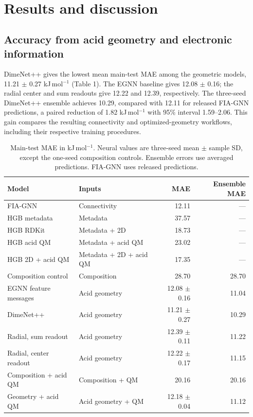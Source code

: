 \section{Results and discussion}

\subsection{Accuracy from acid geometry and electronic information}

DimeNet++ gives the lowest mean main-test MAE among the geometric models, 11.21 $\pm$ 0.27 kJ\,mol$^{-1}$ (Table 1). The EGNN baseline gives 12.08 $\pm$ 0.16; the radial center and sum readouts give 12.22 and 12.39, respectively. The three-seed DimeNet++ ensemble achieves 10.29, compared with 12.11 for released FIA-GNN predictions, a paired reduction of 1.82 kJ\,mol$^{-1}$ with 95\% interval 1.59--2.06. This gain compares the resulting connectivity and optimized-geometry workflows, including their respective training procedures.

\begin{table}[tp]
\centering\small
\caption{Main-test MAE in kJ\,mol$^{-1}$. Neural values are three-seed mean $\pm$ sample SD, except the one-seed composition controls. Ensemble errors use averaged predictions. FIA-GNN uses released predictions.}
\begin{tabularx}{\textwidth}{@{}>{\raggedright\arraybackslash}p{}>{\raggedright\arraybackslash}Xrr@{}}
\toprule
Model & Inputs & MAE & Ensemble MAE \\ \midrule
FIA-GNN & Connectivity & 12.11 & --- \\
HGB metadata & Metadata & 37.57 & --- \\
HGB RDKit & Metadata + 2D & 18.73 & --- \\
HGB acid QM & Metadata + acid QM & 23.02 & --- \\
HGB 2D + acid QM & Metadata + 2D + acid QM & 17.35 & --- \\
Composition control & Composition & 28.70 & 28.70 \\
EGNN feature messages & Acid geometry & 12.08 $\pm$ 0.16 & 11.04 \\
DimeNet++ & Acid geometry & 11.21 $\pm$ 0.27 & 10.29 \\
Radial, sum readout & Acid geometry & 12.39 $\pm$ 0.11 & 11.22 \\
Radial, center readout & Acid geometry & 12.22 $\pm$ 0.17 & 11.15 \\
Composition + acid QM & Composition + QM & 20.16 & 20.16 \\
Geometry + acid QM & Acid geometry + QM & 12.18 $\pm$ 0.04 & 11.12 \\
\bottomrule
\end{tabularx}
\end{table}

